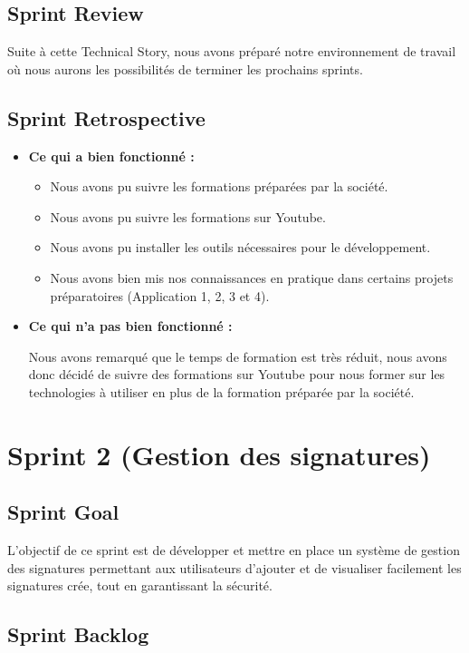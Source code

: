 \subsection{Sprint Review}
Suite à cette Technical Story, nous avons préparé notre environnement de travail où nous aurons les possibilités de terminer les prochains sprints.

\subsection{Sprint Retrospective}

\begin{itemize}
  \item \textbf{Ce qui a bien fonctionné :}
  \begin{itemize}
    \item Nous avons pu suivre les formations préparées par la société.
    \item Nous avons pu suivre les formations sur Youtube.
    \item Nous avons pu installer les outils nécessaires pour le développement.
    \item Nous avons bien mis nos connaissances en pratique dans certains projets préparatoires (Application 1, 2, 3 et 4).
  \end{itemize}
  \item \textbf{Ce qui n'a pas bien fonctionné :}
  
  Nous avons remarqué que le temps de formation est très réduit, nous avons donc décidé de suivre des formations sur Youtube pour nous former sur les technologies à utiliser en plus de la formation préparée par la société.
\end{itemize}

\section{Sprint 2 (Gestion des signatures)}

\subsection{Sprint Goal}

L'objectif de ce sprint est de développer et mettre en place un système de gestion des signatures permettant aux utilisateurs d'ajouter et de visualiser facilement les signatures crée, tout en garantissant la sécurité.

\pagebreak
\subsection{Sprint Backlog}

